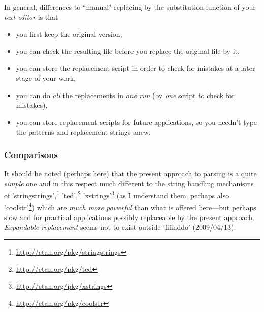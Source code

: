 \documentclass{article}
\begin{document}
In general, differences to ``manual" replacing by the substitution 
function of your \emph{text editor} is that 
\begin{itemize}
\item you first keep the original version, 
\item you can check the resulting file before you replace the original 
      file by it, 
\item you can store the replacement script in order to check for 
      mistakes at a later stage of your work, 
\item you can do \emph{all} the replacements in \emph{one run} 
      (by \emph{one} script to check for mistakes), 
\item you can store replacement scripts for future applications, 
      so you needn't type the patterns and replacement strings anew. 
\end{itemize}


\subsubsection{Comparisons} %
% 
% 
% 
% 
It should be noted (perhaps here) that the present approach to parsing 
is a quite \emph{simple} one and in this respect much different to the 
string handling mechanisms of 
'stringstrings',\footnote{\url{http://ctan.org/pkg/stringstrings}} 
'ted',\footnote{\url{http://ctan.org/pkg/ted}} 
'xstrings'\footnote{\url{http://ctan.org/pkg/xstrings}} 
(as I understand them, perhaps also 
'coolstr'\footnote{\url{http://ctan.org/pkg/coolstr}}) 
which are \emph{much more powerful} than what is offered here---but 
perhaps slow and for practical applications possibly replaceable by 
the present approach.
\emph{Expandable replacement} seems not to exist outside 'fifinddo' 
(2009/04/13).
\end{document}
